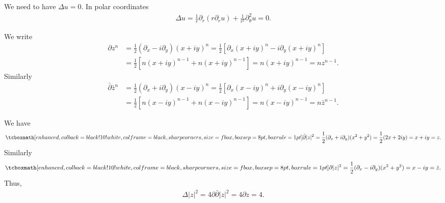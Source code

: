 
We need to have $\Delta u = 0$.
In polar coordinates
\begin{eqnarray}
    \label{eq:polar-lap}
    \Delta u = \frac{1}{r}\partial_{r}(r\partial_{r}u) + \frac{1}{r^2}\partial_{\theta}^2 u = 0
.\end{eqnarray}





We write
\begin{align}
    \label{eq:deriv-zn}
    \partial z^{n} &= \frac{1}{2} (\partial_{x} - i \partial_{y})(x + iy)^{n} = \frac{1}{2} [ \partial_{x}(x + iy)^{n} - i\partial_{y} (x + iy)^{n} ] \\
    &= \frac{1}{2}[n(x+iy)^{n-1} + n(x+iy)^{n-1}] = n (x+iy)^{n-1} = nz^{n-1}
.\end{align}
Similarly
\begin{align}
    \label{eq:deriv-zbarn}
    \bar{\partial} \bar{z}^{n} &= \frac{1}{2} (\partial_{x} + i \partial_{y})(x - iy)^{n} = \frac{1}{2} [ \partial_{x}(x - iy)^{n} + i\partial_{y} (x - iy)^{n} ] \\
    &= \frac{1}{2}[n(x-iy)^{n-1} + n(x-iy)^{n-1}] = n (x-iy)^{n-1} = n \bar{z}^{n-1}
.\end{align}



We have
\begin{eqnarray}
    \label{eq:partialbar-z2}
    \eqbox{
    \bar{\partial} |z|^2 = \frac{1}{2}(\partial_{x} + i \partial_{y}) (x^2 + y^2) = \frac{1}{2}(2x + 2iy) = x + iy = z
}
.\end{eqnarray}
Similarly
\begin{eqnarray}
    \label{eq:partial-z2}
    \eqbox{
    \partial |z|^2 = \frac{1}{2}(\partial_{x} - i \partial_{y}) (x^2 + y^2) = x - iy = \bar{z}
}
.\end{eqnarray}
Thus,
\begin{eqnarray}
    \label{eq:lap-z2}
    \Delta |z|^2 = 4 \partial\bar{\partial} |z|^2 = 4 \partial z = 4
.\end{eqnarray}




